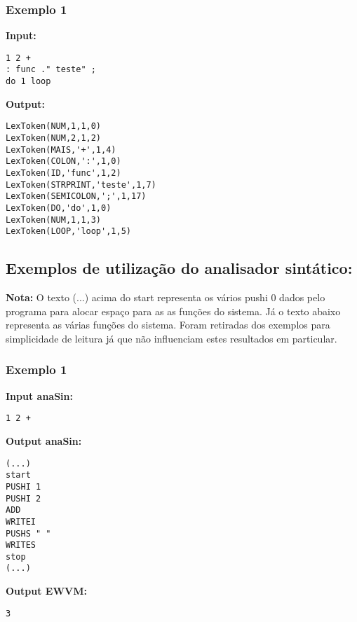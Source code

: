 \documentclass{article}
\begin{document}
\subsubsection{Exemplo 1}

\begin{minipage}{0.45\textwidth}
\textbf{Input:} 
\begin{verbatim}
1 2 + 
: func ." teste" ; 
do 1 loop 
\end{verbatim}
\end{minipage}
\hfill
\begin{minipage}{0.45\textwidth}
\textbf{Output:} 
\begin{verbatim}
LexToken(NUM,1,1,0)
LexToken(NUM,2,1,2)
LexToken(MAIS,'+',1,4)
LexToken(COLON,':',1,0)
LexToken(ID,'func',1,2)
LexToken(STRPRINT,'teste',1,7)
LexToken(SEMICOLON,';',1,17)
LexToken(DO,'do',1,0)
LexToken(NUM,1,1,3)
LexToken(LOOP,'loop',1,5)
\end{verbatim}

\end{minipage}

\subsection{Exemplos de utilização do analisador sintático:}

\textbf{Nota:} O texto (...) acima do start representa os vários pushi 0 dados pelo programa para alocar espaço para as as funções do sistema. Já o texto abaixo representa as várias funções do sistema. Foram retiradas dos exemplos para simplicidade de leitura já que não influenciam estes resultados em particular. 



\subsubsection{Exemplo 1}
\begin{minipage}{0.32\textwidth}
\textbf{Input anaSin:} 
\begin{verbatim}
1 2 + 
\end{verbatim}
\end{minipage}
\hfill
\begin{minipage}{0.32\textwidth}
\textbf{Output anaSin:} 
\begin{verbatim}
(...)
start
PUSHI 1
PUSHI 2
ADD
WRITEI
PUSHS " "
WRITES
stop
(...)
\end{verbatim}
\end{minipage}
\begin{minipage}{0.32\textwidth}
\textbf{Output EWVM:} 
\begin{verbatim}
3
\end{verbatim}
\end{minipage}
\end{document}
